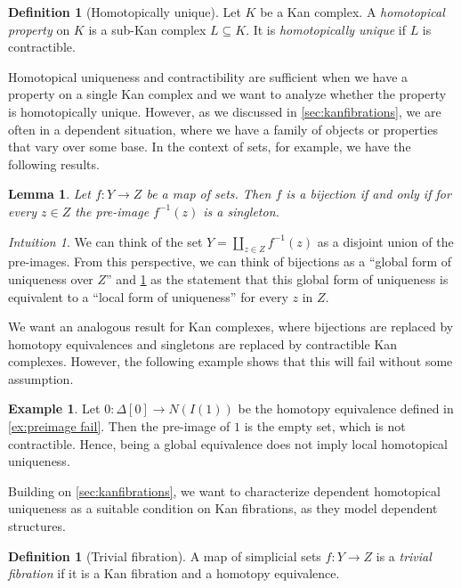 \documentclass[11pt, a4paper]{amsart}
\newtheorem{lemma}[equation]{Lemma}
\theoremstyle{definition}
\newtheorem{definition}[equation]{Definition}
\newtheorem{example}[equation]{Example}
\theoremstyle{remark}
\newtheorem{intuition}[equation]{Intuition}
\numberwithin{equation}{section}
\begin{document}
\begin{definition}[Homotopically unique] \label{def:homotopicallyunique}
  Let $K$ be a Kan complex. A \emph{homotopical property} on $K$ is a sub-Kan complex $L \subseteq K$. It is \emph{homotopically unique} if $L$ is contractible.
\end{definition}

Homotopical uniqueness and contractibility are sufficient when we have a property on a single Kan complex and we want to analyze whether the property is homotopically unique. However, as we discussed in \cref{sec:kanfibrations}, we are often in a dependent situation, where we have a family of objects or properties that vary over some base. In the context of sets, for example, we have the following results.

\begin{lemma} \label{lemma:dependent uniqueness}
 Let $f\colon Y \to Z$ be a map of sets. Then $f$ is a bijection if and only if for every $z \in Z$ the pre-image $f^{-1}(z)$ is a singleton. 
\end{lemma}

\begin{intuition}
  We can think of the set $Y = \coprod_{z \in Z} f^{-1}(z)$ as a disjoint union of the pre-images. From this perspective, we can think of bijections as a ``global form of uniqueness over $Z$'' and \cref{lemma:dependent uniqueness} as the statement that this global form of uniqueness is equivalent to a ``local form of uniqueness'' for every $z$ in $Z$. 
\end{intuition}

We want an analogous result for Kan complexes, where bijections are replaced by homotopy equivalences and singletons are replaced by contractible Kan complexes. However, the following example shows that this will fail without some assumption.

\begin{example}
  Let $0\colon\Delta[0] \to N(I(1))$ be the homotopy equivalence defined in \cref{ex:preimage fail}. Then the pre-image of $1$ is the empty set, which is not contractible. Hence, being a global equivalence does not imply local homotopical uniqueness. 
\end{example}

Building on \cref{sec:kanfibrations}, we want to characterize dependent homotopical uniqueness as a suitable condition on Kan fibrations, as they model dependent structures.

\begin{definition}[Trivial fibration]
   A map of simplicial sets $f\colon Y \to Z$ is a \emph{trivial fibration} if it is a Kan fibration and a homotopy equivalence.
\end{definition}
\end{document}
